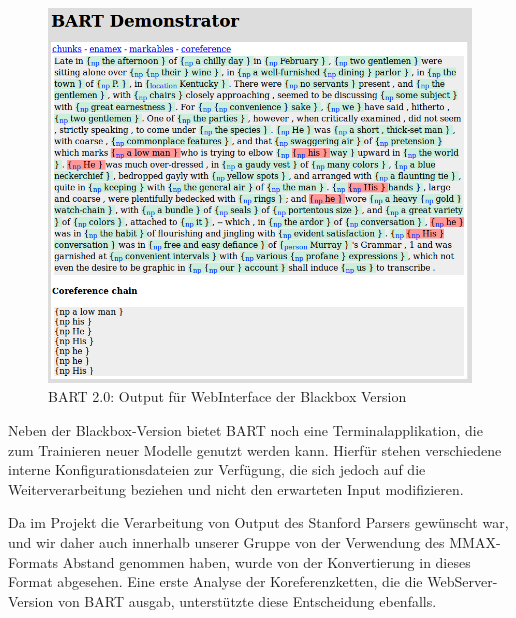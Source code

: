 \begin{figure}[ht]
\begin{center}
\includegraphics[width=12cm]{./img/cle/bart_webUI_output.png}
\caption{BART 2.0: Output für WebInterface der Blackbox Version}
\label{bart_webUI_output}
\end{center}
\end{figure}

\noindent
Neben der Blackbox-Version bietet BART noch eine Terminalapplikation, 
die zum Trainieren neuer Modelle genutzt werden kann.
Hierfür stehen verschiedene interne Konfigurationsdateien zur Verfügung,
die sich jedoch auf die Weiterverarbeitung beziehen und nicht den erwarteten
Input modifizieren.

Da im Projekt die Verarbeitung von Output des Stanford Parsers gewünscht war,
und wir daher auch innerhalb unserer Gruppe von der Verwendung des MMAX-Formats 
Abstand genommen haben, wurde von der Konvertierung in dieses Format abgesehen.
Eine erste Analyse der Koreferenzketten, die die WebServer-Version von BART ausgab,
unterstützte diese Entscheidung ebenfalls.

